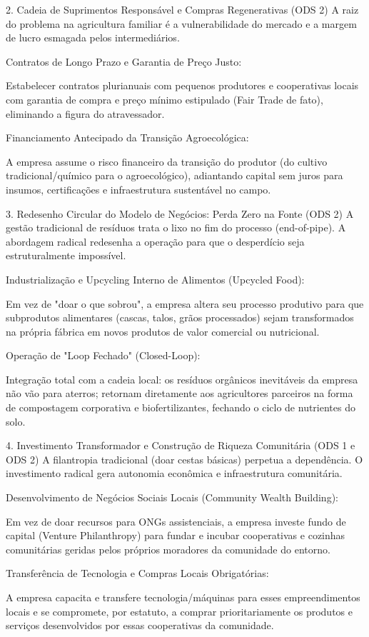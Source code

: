 2. Cadeia de Suprimentos Responsável e Compras Regenerativas (ODS 2)
A raiz do problema na agricultura familiar é a vulnerabilidade do mercado e a margem de lucro esmagada pelos intermediários.

Contratos de Longo Prazo e Garantia de Preço Justo:

Estabelecer contratos plurianuais com pequenos produtores e cooperativas locais com garantia de compra e preço mínimo estipulado (Fair Trade de fato), eliminando a figura do atravessador.

Financiamento Antecipado da Transição Agroecológica:

A empresa assume o risco financeiro da transição do produtor (do cultivo tradicional/químico para o agroecológico), adiantando capital sem juros para insumos, certificações e infraestrutura sustentável no campo.

3. Redesenho Circular do Modelo de Negócios: Perda Zero na Fonte (ODS 2)
A gestão tradicional de resíduos trata o lixo no fim do processo (end-of-pipe). A abordagem radical redesenha a operação para que o desperdício seja estruturalmente impossível.

Industrialização e Upcycling Interno de Alimentos (Upcycled Food):

Em vez de "doar o que sobrou", a empresa altera seu processo produtivo para que subprodutos alimentares (cascas, talos, grãos processados) sejam transformados na própria fábrica em novos produtos de valor comercial ou nutricional.

Operação de "Loop Fechado" (Closed-Loop):

Integração total com a cadeia local: os resíduos orgânicos inevitáveis da empresa não vão para aterros; retornam diretamente aos agricultores parceiros na forma de compostagem corporativa e biofertilizantes, fechando o ciclo de nutrientes do solo.

4. Investimento Transformador e Construção de Riqueza Comunitária (ODS 1 e ODS 2)
A filantropia tradicional (doar cestas básicas) perpetua a dependência. O investimento radical gera autonomia econômica e infraestrutura comunitária.

Desenvolvimento de Negócios Sociais Locais (Community Wealth Building):

Em vez de doar recursos para ONGs assistenciais, a empresa investe fundo de capital (Venture Philanthropy) para fundar e incubar cooperativas e cozinhas comunitárias geridas pelos próprios moradores da comunidade do entorno.

Transferência de Tecnologia e Compras Locais Obrigatórias:

A empresa capacita e transfere tecnologia/máquinas para esses empreendimentos locais e se compromete, por estatuto, a comprar prioritariamente os produtos e serviços desenvolvidos por essas cooperativas da comunidade.


